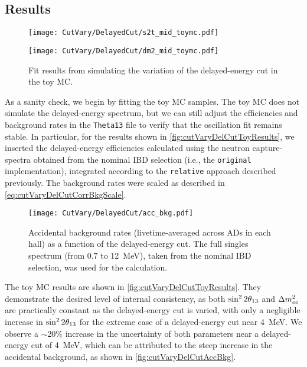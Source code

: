 \documentclass[../thesis.tex]{subfiles}
\begin{document}
\subsection{Results}
\label{sec:cutVaryDelCutResults}

\begin{figure}[ht]
  \begin{minipage}{0.5\linewidth}%
    \texttt{[image: CutVary/DelayedCut/s2t\_mid\_toymc.pdf]}%
  \end{minipage}%
  \begin{minipage}{0.5\linewidth}%
    \texttt{[image: CutVary/DelayedCut/dm2\_mid\_toymc.pdf]}%
  \end{minipage}%
  \caption{Fit results from simulating the variation of the delayed-energy cut in the toy MC.}
  \label{fig:cutVaryDelCutToyResults}
\end{figure}

As a sanity check, we begin by fitting the toy MC samples. The toy MC does not simulate the delayed-energy spectrum, but we can still adjust the efficiencies and background rates in the \texttt{Theta13} file to verify that the oscillation fit remains stable. In particular, for the results shown in \autoref{fig:cutVaryDelCutToyResults}, we inserted the delayed-energy efficiencies calculated using the neutron capture-spectra obtained from the nominal IBD selection (i.e., the \texttt{original} implementation), integrated according to the \texttt{relative} approach described previously.
The background rates were scaled as described in \autoref{eq:cutVaryDelCutCorrBkgScale}.

\begin{figure}[ht]
  \texttt{[image: CutVary/DelayedCut/acc\_bkg.pdf]}
  \caption{Accidental background rates (livetime-averaged across ADs in each hall) as a function of the delayed-energy cut. The full singles spectrum (from 0.7 to 12~MeV), taken from the nominal IBD selection, was used for the calculation.}
  \label{fig:cutVaryDelCutAccBkg}
\end{figure}

The toy MC results are shown in \autoref{fig:cutVaryDelCutToyResults}. They demonstrate the desired level of internal consistency, as both $\sin^2 2\theta_{13}$ and $\Delta m^2_{ee}$ are practically constant as the delayed-energy cut is varied, with only a negligible increase in $\sin^2 2\theta_{13}$ for the extreme case of a delayed-energy cut near 4~MeV. We observe a $\sim$20\% increase in the uncertainty of both parameters near a delayed-energy cut of 4~MeV, which can be attributed to the steep increase in the accidental background, as shown in \autoref{fig:cutVaryDelCutAccBkg}.
\end{document}
